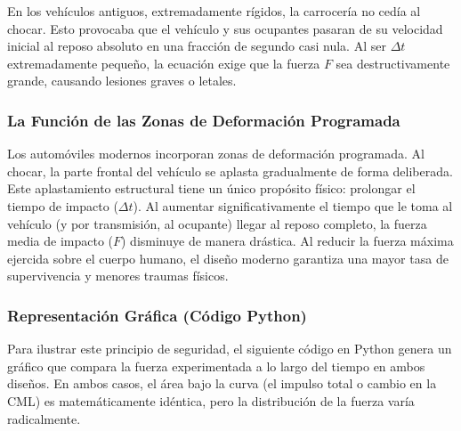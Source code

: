 \documentclass{article}
\begin{document}
En los vehículos antiguos, extremadamente rígidos, la carrocería no cedía al chocar. Esto provocaba que el vehículo y sus ocupantes pasaran de su velocidad inicial al reposo absoluto en una fracción de segundo casi nula. Al ser $\Delta t$ extremadamente pequeño, la ecuación exige que la fuerza $F$ sea destructivamente grande, causando lesiones graves o letales.

\subsubsection*{La Función de las Zonas de Deformación Programada}
Los automóviles modernos incorporan zonas de deformación programada. Al chocar, la parte frontal del vehículo se aplasta gradualmente de forma deliberada. Este aplastamiento estructural tiene un único propósito físico: prolongar el tiempo de impacto ($\Delta t$). Al aumentar significativamente el tiempo que le toma al vehículo (y por transmisión, al ocupante) llegar al reposo completo, la fuerza media de impacto ($F$) disminuye de manera drástica. Al reducir la fuerza máxima ejercida sobre el cuerpo humano, el diseño moderno garantiza una mayor tasa de supervivencia y menores traumas físicos.

\subsubsection*{Representación Gráfica (Código Python)}
Para ilustrar este principio de seguridad, el siguiente código en Python genera un gráfico que compara la fuerza experimentada a lo largo del tiempo en ambos diseños. En ambos casos, el área bajo la curva (el impulso total o cambio en la CML) es matemáticamente idéntica, pero la distribución de la fuerza varía radicalmente.
\end{document}
